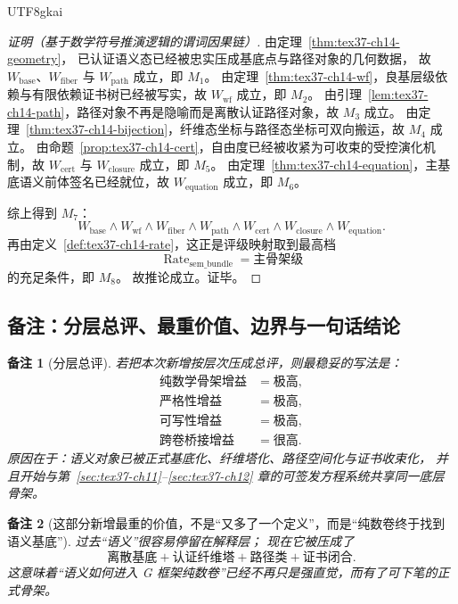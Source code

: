 \documentclass[12pt]{article}
\newtheorem{remark}{备注}[section]
\begin{document}
\begin{CJK*}{UTF8}{gkai}
\begin{proof}[证明（基于数学符号推演逻辑的谓词因果链）]
由定理~\ref{thm:tex37-ch14-geometry}，
已认证语义态已经被忠实压成基底点与路径对象的几何数据，
故 $W_{\mathrm{base}}$、$W_{\mathrm{fiber}}$ 与 $W_{\mathrm{path}}$ 成立，即 $M_1$。
由定理~\ref{thm:tex37-ch14-wf}，良基层级依赖与有限依赖证书树已经被写实，故 $W_{\mathrm{wf}}$ 成立，即 $M_2$。
由引理~\ref{lem:tex37-ch14-path}，路径对象不再是隐喻而是离散认证路径对象，故 $M_3$ 成立。
由定理~\ref{thm:tex37-ch14-bijection}，纤维态坐标与路径态坐标可双向搬运，故 $M_4$ 成立。
由命题~\ref{prop:tex37-ch14-cert}，自由度已经被收紧为可收束的受控演化机制，故 $W_{\mathrm{cert}}$ 与 $W_{\mathrm{closure}}$ 成立，即 $M_5$。
由定理~\ref{thm:tex37-ch14-equation}，主基底语义前体签名已经就位，故 $W_{\mathrm{equation}}$ 成立，即 $M_6$。

综上得到 $M_7$：
\[
  W_{\mathrm{base}}\wedge W_{\mathrm{wf}}\wedge W_{\mathrm{fiber}}\wedge W_{\mathrm{path}}\wedge W_{\mathrm{cert}}\wedge
    W_{\mathrm{closure}}\wedge W_{\mathrm{equation}}.
\]
再由定义~\ref{def:tex37-ch14-rate}，这正是评级映射取到最高档
\[
  \operatorname{Rate}_{\mathrm{sem\_bundle}}=\mathrm{主骨架级}
\]
的充足条件，即 $M_8$。
故推论成立。证毕。
\end{proof}

\subsection{备注：分层总评、最重价值、边界与一句话结论}
\label{subsec:tex37-ch14-remarks}

\begin{remark}[分层总评]
若把本次新增按层次压成总评，则最稳妥的写法是：
\[
  \begin{aligned}
    \text{纯数学骨架增益} &= \text{极高},\\
    \text{严格性增益} &= \text{极高},\\
    \text{可写性增益} &= \text{极高},\\
    \text{跨卷桥接增益} &= \text{很高}.
  \end{aligned}
\]
原因在于：语义对象已被正式基底化、纤维塔化、路径空间化与证书收束化，
并且开始与第~\ref{sec:tex37-ch11}--\ref{sec:tex37-ch12} 章的可签发方程系统共享同一底层骨架。
\end{remark}

\begin{remark}[这部分新增最重的价值，不是“又多了一个定义”，而是“纯数卷终于找到语义基底”]
过去“语义”很容易停留在解释层；
现在它被压成了
\[
  \text{离散基底}
  +
  \text{认证纤维塔}
  +
  \text{路径类}
  +
  \text{证书闭合}.
\]
这意味着“语义如何进入 G 框架纯数卷”已经不再只是强直觉，而有了可下笔的正式骨架。
\end{remark}


\end{CJK*}
\end{document}

